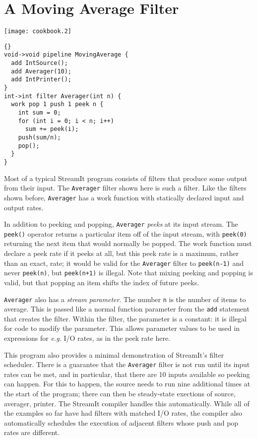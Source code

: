 \section{A Moving Average Filter}

\begin{textpic}{\texttt{[image: cookbook.2]}}
\begin{lstlisting}{}
void->void pipeline MovingAverage {
  add IntSource();
  add Averager(10);
  add IntPrinter();
}
int->int filter Averager(int n) {
  work pop 1 push 1 peek n {
    int sum = 0;
    for (int i = 0; i < n; i++)
      sum += peek(i);
    push(sum/n);
    pop();
  }
}
\end{lstlisting}
\end{textpic}

Most of a typical StreamIt program consists of filters that produce
some output from their input.  The \lstinline|Averager| filter shown
here is such a filter.  Like the filters shown before,
\lstinline|Averager| has a work function with statically declared
input and output rates.

In addition to peeking and popping, \lstinline|Averager| \emph{peeks}
at its input stream.  The \lstinline|peek()| operator returns a
particular item off of the input stream, with \lstinline|peek(0)|
returning the next item that would normally be popped.  The work
function must declare a peek rate if it peeks at all, but this peek
rate is a maximum, rather than an exact, rate; it would be valid for
the \lstinline|Averager| filter to \lstinline|peek(n-1)| and never
\lstinline|peek(n)|, but \lstinline|peek(n+1)| is illegal.  Note that
mixing peeking and popping is valid, but that popping an item shifts
the index of future peeks.

\lstinline|Averager| also has a \emph{stream parameter}.  The number
\lstinline|n| is the number of items to average.  This is passed like
a normal function parameter from the \lstinline|add| statement that
creates the filter.  Within the filter, the parameter is a constant:
it is illegal for code to modify the parameter.  This allows parameter
values to be used in expressions for \emph{e.g.} I/O rates, as in the
peek rate here.

This program also provides a minimal demonstration of StreamIt's
filter scheduler.  There is a guarantee that the \lstinline|Averager|
filter is not run until its input rates can be met, and in particular,
that there are 10 inputs available so peeking can happen.  For this to
happen, the source needs to run nine additional times at the start of
the program; there can then be steady-state exections of source,
averager, printer.  The StreamIt compiler handles this automatically.
While all of the examples so far have had filters with matched I/O
rates, the compiler also automatically schedules the execution of
adjacent filters whose push and pop rates are different.

